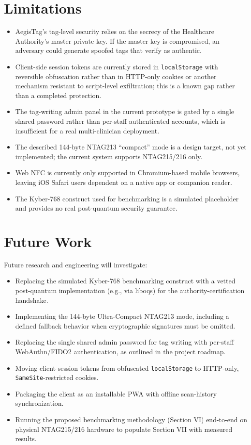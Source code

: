 \documentclass[conference]{IEEEtran}
\begin{document}
\section{Limitations}
\begin{itemize}
\item AegisTag's tag-level security relies on the secrecy of the Healthcare Authority's master private key. If the master key is compromised, an adversary could generate spoofed tags that verify as authentic.
\item Client-side session tokens are currently stored in \texttt{localStorage} with reversible obfuscation rather than in HTTP-only cookies or another mechanism resistant to script-level exfiltration; this is a known gap rather than a completed protection.
\item The tag-writing admin panel in the current prototype is gated by a single shared password rather than per-staff authenticated accounts, which is insufficient for a real multi-clinician deployment.
\item The described 144-byte NTAG213 ``compact'' mode is a design target, not yet implemented; the current system supports NTAG215/216 only.
\item Web NFC is currently only supported in Chromium-based mobile browsers, leaving iOS Safari users dependent on a native app or companion reader.
\item The Kyber-768 construct used for benchmarking is a simulated placeholder and provides no real post-quantum security guarantee.
\end{itemize}

\section{Future Work}
Future research and engineering will investigate:
\begin{itemize}
\item Replacing the simulated Kyber-768 benchmarking construct with a vetted post-quantum implementation (e.g., via liboqs) for the authority-certification handshake.
\item Implementing the 144-byte Ultra-Compact NTAG213 mode, including a defined fallback behavior when cryptographic signatures must be omitted.
\item Replacing the single shared admin password for tag writing with per-staff WebAuthn/FIDO2 authentication, as outlined in the project roadmap.
\item Moving client session tokens from obfuscated \texttt{localStorage} to HTTP-only, \texttt{SameSite}-restricted cookies.
\item Packaging the client as an installable PWA with offline scan-history synchronization.
\item Running the proposed benchmarking methodology (Section VI) end-to-end on physical NTAG215/216 hardware to populate Section VII with measured results.
\end{itemize}
\end{document}
